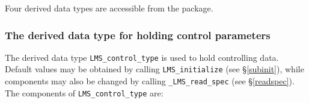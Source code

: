 \documentclass{galahad}
\newcommand{\packagename}{LMS}
\newcommand{\fullpackagename}{\libraryname\_\packagename}
\begin{document}

%


\galtypes
Four derived data types are accessible from the package.


\subsubsection{The derived data type for holding control
 parameters}\label{typecontrol}
The derived data type
{\tt \packagename\_control\_type}
is used to hold controlling data. Default values may be obtained by calling
{\tt \packagename\_initialize}
(see \S\ref{subinit}),
while components may also be changed by calling
{\tt \fullpackagename\_read\-\_spec}
(see \S\ref{readspec}).
The components of
{\tt \packagename\_control\_type}
are:
\end{document}
